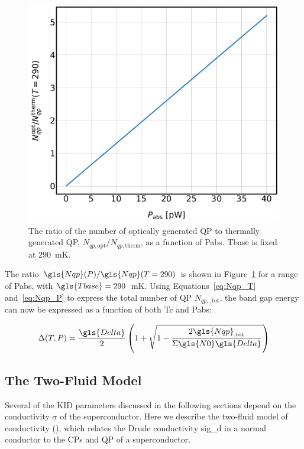 \begin{figure}[!htbp]
\centering
\includegraphics[width=\textwidth]{figures/kid_model/Nqp_ratio}
\caption[The ratio of the number of optically generated to thermally generated QP as a function of absorbed optical power.]{The ratio of the number of optically generated QP to thermally generated QP, $N_{qp,\mathrm{opt}}/N_{qp,\mathrm{therm}}$, as a function of \gls{Pabs}. \gls{Tbase} is fixed at 290~mK.}
\label{fig:Nrat}
\end{figure}

The ratio $\gls{Nqp}(P)/\gls{Nqp}(T = 290)$ is shown in Figure~\ref{fig:Nrat} for a range of \gls{Pabs}, with $\gls{Tbase} = 290$~mK. Using Equations~\ref{eq:Nqp_T} and~\ref{eq:Nqp_P} to express the total number of QP $N_{qp,\mathrm{,tot}}$, the band gap energy can now be expressed as a function of both \gls{Tc} and \gls{Pabs}:

\begin{equation}
 \Delta(T,P) = \frac{\gls{Delta}}{2}\left( 1 + \sqrt{1 - \frac{2\gls{Nqp}_{\mathrm{,tot}}} {\Sigma\gls{N0}\gls{Delta}}} \right)
\end{equation}

\subsection{The Two-Fluid Model}\label{two_fluid_model}

Several of the KID parameters discussed in the following sections depend on the conductivity $\sigma$ of the superconductor. Here we describe the two-fluid model of conductivity (\citet{glover1957conductivity,mattis1958theory}), which relates the Drude conductivity \gls{sig_d} in a normal conductor to the CPs and QP of a superconductor.

